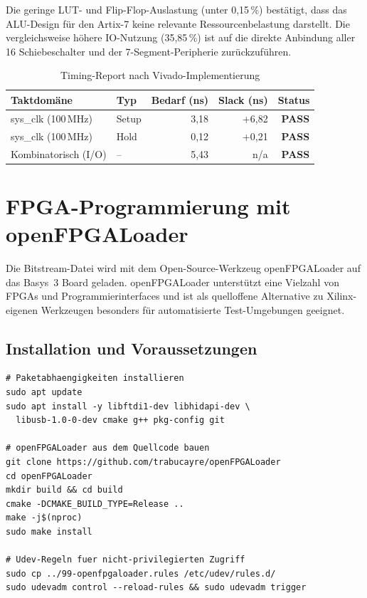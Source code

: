 ﻿\documentclass[12pt,a4paper]{report}
\begin{document}
Die geringe LUT- und Flip-Flop-Auslastung (unter 0{,}15\,\%) bestätigt, dass das ALU-Design für den Artix-7 keine relevante Ressourcenbelastung darstellt. Die vergleichsweise höhere IO-Nutzung (35{,}85\,\%) ist auf die direkte Anbindung aller 16 Schiebeschalter und der 7-Segment-Peripherie zurückzuführen.

\begin{table}[H]
\centering
\begin{tabular}{|l|l|r|r|r|}
\hline
\textbf{Taktdomäne} & \textbf{Typ} & \textbf{Bedarf (ns)} & \textbf{Slack (ns)} & \textbf{Status} \\
\hline
sys\_clk (100\,MHz) & Setup & 3{,}18 & +6{,}82 & \textbf{PASS} \\
sys\_clk (100\,MHz) & Hold  & 0{,}12 & +0{,}21 & \textbf{PASS} \\
Kombinatorisch (I/O)& --    & 5{,}43 & n/a     & \textbf{PASS} \\
\hline
\end{tabular}
\caption{Timing-Report nach Vivado-Implementierung}
\label{tab:timing}
\end{table}

\section{FPGA-Programmierung mit openFPGALoader}
\label{sec:fpga_programmierung}

Die Bitstream-Datei wird mit dem Open-Source-Werkzeug openFPGALoader auf das Basys~3 Board geladen. openFPGALoader unterstützt eine Vielzahl von FPGAs und Programmierinterfaces und ist als quelloffene Alternative zu Xilinx-eigenen Werkzeugen besonders für automatisierte Test-Umgebungen geeignet.

\subsection{Installation und Voraussetzungen}
\label{subsec:openfpgaloader_install}

\begin{lstlisting}[style=bashstyle, caption={Installation von openFPGALoader unter Ubuntu/Debian}]
# Paketabhaengigkeiten installieren
sudo apt update
sudo apt install -y libftdi1-dev libhidapi-dev \
  libusb-1.0-0-dev cmake g++ pkg-config git

# openFPGALoader aus dem Quellcode bauen
git clone https://github.com/trabucayre/openFPGALoader
cd openFPGALoader
mkdir build && cd build
cmake -DCMAKE_BUILD_TYPE=Release ..
make -j$(nproc)
sudo make install

# Udev-Regeln fuer nicht-privilegierten Zugriff
sudo cp ../99-openfpgaloader.rules /etc/udev/rules.d/
sudo udevadm control --reload-rules && sudo udevadm trigger
\end{lstlisting}
\end{document}
